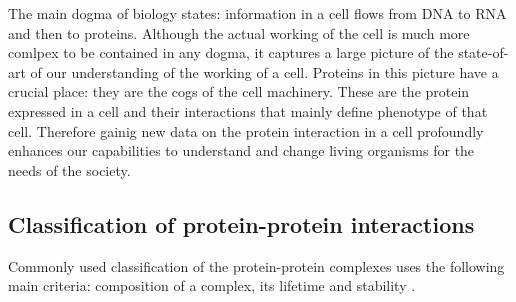 The main dogma of biology states: information in a cell flows from DNA to RNA and then to proteins. Although the actual working of the cell is much more comlpex to be
contained in any dogma, it captures a large picture of the state-of-art of our understanding of the working of a cell. Proteins in this picture have a crucial place:
they are the cogs of the cell machinery. These are the protein expressed in a cell and their interactions that mainly define phenotype of that cell. Therefore gainig new 
data on the protein interaction in a cell profoundly enhances our capabilities to understand and change living organisms for the needs of the society.

\subsection{Classification of protein-protein interactions}
Commonly used classification of the protein-protein complexes uses the following main criteria: composition of a complex, its lifetime and stability \cite{nooren2003diversity}.


